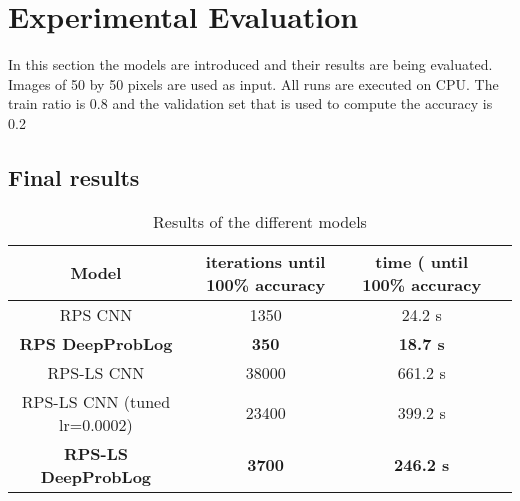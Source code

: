 \section{Experimental Evaluation}
In this section the models are introduced and their results are being evaluated. Images of 50 by 50 pixels are used as input. All runs are executed on CPU. The train ratio is 0.8 and the validation set that is used to compute the accuracy is 0.2






\subsection{Final results}


\begin{table}[!h]
    \centering
    \begin{tabular}{|c|c|c|c|}
        \hline
        Model & iterations until 100\% accuracy  & time ( until 100\% accuracy    \\
        \hline\hline
        RPS CNN & 1350 & 24.2 s \\
        \hline
        \textbf{RPS DeepProbLog} & \textbf{350} & \textbf{18.7 s} \\
        \hline
        \hline
        RPS-LS CNN & 38000 & 661.2 s\\
        \hline
        RPS-LS CNN (tuned lr=0.0002)& 23400 & 399.2 s\\
        \hline
        \textbf{RPS-LS DeepProbLog} & \textbf{3700} & \textbf{246.2 s}\\
        \hline
    \end{tabular}
    \caption{Results of the different models}
    \label{t1}
    \end{table}